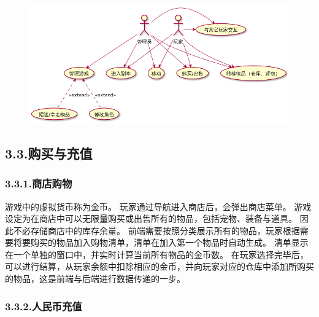\documentclass{article}
\begin{document}
\begin{figure}[tbp]%
\begin{mdcenter}%

\noindent{}\includegraphics[keepaspectratio=true,width=\dimwidth{1.00}]{./img/2}{}%

\mdhr{}%

\noindent{}%
\end{mdcenter}%
\end{figure}%

\subsection{3.3.\hspace*{0.5em}购买与充值}\label{33}%

\subsubsection{3.3.1.\hspace*{0.5em}商店购物}\label{331}%

\noindent{}游戏中的虚拟货币称为金币。 玩家通过导航进入商店后，会弹出商店菜单。 游戏设定为在商店中可以无限量购买或出售所有的物品，包括宠物、装备与道具。 因此不必存储商店中的库存余量。 前端需要按照分类展示所有的物品，玩家根据需要将要购买的物品加入购物清单，清单在加入第一个物品时自动生成。 清单显示在一个单独的窗口中，并实时计算当前所有物品的金币数。 在玩家选择完毕后，可以进行结算，从玩家余额中扣除相应的金币，并向玩家对应的仓库中添加所购买的物品，这是前端与后端进行数据传递的一步。%

\subsubsection{3.3.2.\hspace*{0.5em}人民币充值}\label{332}%
\end{document}
